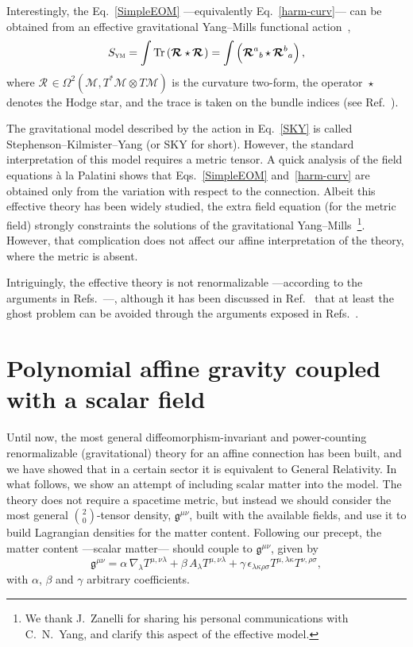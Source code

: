 \documentclass[aps,prd,12pt,twocolumn,superscriptaddress,showpacs,showkeys,reprint,longbibliography]{revtex4-1}
\DeclareMathOperator{\st}{\star}
\newcommand{\Mi}{\mathcal{M}}
\newcommand{\Rif}[2]{\boldsymbol{\mathcal{R}}^{{#1}}{}_{{#2}}}
\newcommand{\Tr}{\operatorname{Tr}}
\renewcommand{\(}{\left(}
\renewcommand{\)}{\right)}
\renewcommand{\[}{\left[}
\renewcommand{\]}{\right]}
\begin{document}
Interestingly, the Eq.~\eqref{SimpleEOM} ---equivalently Eq.~\eqref{harm-curv}--- can be obtained from an effective gravitational Yang--Mills functional action~\cite{stephenson1958quadratic,kilmister1961use,Yang1974}, %
\begin{equation}
  \label{SKY}
  S_{\textsc{ym}} = \int \Tr \left( \Rif{}{} \st \Rif{}{} \right) = \int \left( \Rif{a}{b} \st \Rif{b}{a} \right),
\end{equation}
where $\Rif{}{} \in \Omega^2(\Mi, T^*\Mi \otimes T\Mi)$ is the curvature two-form, the operator $\st$ denotes the Hodge star, and the trace is taken on the bundle indices (see Ref.~\cite{bourguignon1982yang}).

The gravitational model described by the action in Eq.~\eqref{SKY} is called Stephenson--Kilmister--Yang (or SKY for short). However, the standard interpretation of this model requires a metric tensor. A quick analysis of the field equations \`a la Palatini shows that Eqs.~\eqref{SimpleEOM} and~\eqref{harm-curv} are obtained only from the variation with respect to the connection. Albeit this effective theory has been widely studied, the extra field equation (for the metric field) strongly constraints the solutions of the gravitational Yang--Mills~\footnote{We thank J.~Zanelli for sharing his personal communications with C.~N.~Yang, and clarify this aspect of the effective model.}. However, that complication does not affect our affine interpretation of the theory, where the metric is absent.

Intriguingly, the effective theory is not renormalizable ---according to the arguments in Refs.~\cite{McGady:2013sga,Camanho:2014apa}---, although it has been discussed in Ref.~\cite{Chen:2010at} that at least the ghost problem can be avoided through the arguments exposed in Refs.~\cite{Kleinert:1987eb,Bender:2007wu,Bender:2008vh,Mannheim:2009zj}.


\section{\label{matter}Polynomial affine gravity coupled with a scalar field}

Until now, the most general diffeomorphism-invariant and power-counting renormalizable (gravitational) theory for an affine connection has been built, and we have showed that in a certain sector it is equivalent to General Relativity. In what follows, we show an attempt of including scalar matter into the model. The theory does not require a spacetime metric, but instead we should consider the most general $\binom{2}{0}$-tensor density, $\mathfrak{g}^{\mu\nu}$,  built with the available fields, and use it to build Lagrangian densities for the matter content. Following our precept, the matter content ---scalar matter--- should couple to $\mathfrak{g}^{\mu\nu}$, given by
\begin{dmath}
  \mathfrak{g}^{\mu\nu} = \alpha \, \nabla_\lambda T^{\mu,\nu\lambda} + \beta \, A_\lambda T^{\mu,\nu\lambda} + \gamma \, \epsilon_{\lambda\kappa\rho\sigma} T^{\mu, \lambda\kappa} T^{\nu, \rho\sigma},
  \label{geng}
\end{dmath}
with $\alpha$, $\beta$ and $\gamma$ arbitrary coefficients.
\end{document}
